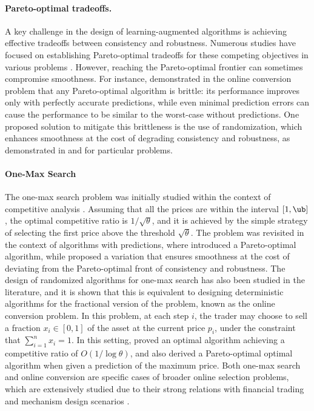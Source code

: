 \paragraph{Pareto-optimal tradeoffs.}
A key challenge in the design of learning-augmented algorithms is achieving effective tradeoffs between consistency and robustness. Numerous studies have focused on establishing Pareto-optimal tradeoffs for these competing objectives in various problems \cite{}. However, reaching the Pareto-optimal frontier can sometimes compromise smoothness. For instance, \cite{} demonstrated in the online conversion problem that any Pareto-optimal algorithm is brittle: its performance improves only with perfectly accurate predictions, while even minimal prediction errors can cause the performance to be similar to the worst-case without predictions. One proposed solution to mitigate this brittleness is the use of randomization, which enhances smoothness at the cost of degrading consistency and robustness, as demonstrated in \cite{} and \cite{} for particular problems.


\paragraph{One-Max Search} 
The one-max search problem was initially studied within the context of competitive analysis \cite{}. Assuming that all the prices are within the interval $[1,\ub]$, the optimal competitive ratio is $1/\sqrt{\theta}$, and it is achieved by the simple strategy of selecting the first price above the threshold $\sqrt{\theta}$. The problem was revisited in the context of algorithms with predictions, where \cite{} introduced a Pareto-optimal algorithm, while \cite{} proposed a variation that ensures smoothness at the cost of deviating from the Pareto-optimal front of consistency and robustness. The design of randomized algorithms for one-max search has also been studied in the literature, and it is shown that this is equivalent to designing deterministic algorithms for the fractional version of the problem, known as the online conversion problem. In this problem, at each step $i$, the trader may choose to sell a fraction $x_i \in [0,1]$ of the asset at the current price $p_i$, under the constraint that $\sum_{i=1}^n x_i = 1$. In this setting, \cite{} proved an optimal algorithm achieving a competitive ratio of $O\left(1/\log \theta\right)$, and \cite{sun_pareto-optimal_2021} also derived a Pareto-optimal optimal algorithm when given a prediction of the maximum price. Both one-max search and online conversion are specific cases of broader online selection problems, which are extensively studied due to their strong relations with financial trading and mechanism design scenarios \cite{correa_recent_2019,cartea_optimal_2015}.


